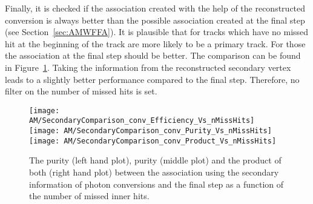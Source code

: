 Finally, it is checked if the association created with the help of the reconstructed conversion is always better than the possible association created at the final step (see Section~\ref{sec:AMWFFA}). It is plausible that for tracks which have no missed hit at the beginning of the track are more likely to be a primary track. For those the association at the final step should be better. The comparison can be found in Figure~\ref{plot:AMWFSVpcEffAndPurVsFA}. Taking the information from the reconstructed secondary vertex leads to a slightly better performance compared to the final step. Therefore, no filter on the number of missed hits is set.

\begin{figure}[!ht]
  \centering
  \texttt{[image: AM/SecondaryComparison\_conv\_Efficiency\_Vs\_nMissHits]}
  \texttt{[image: AM/SecondaryComparison\_conv\_Purity\_Vs\_nMissHits]}
  \texttt{[image: AM/SecondaryComparison\_conv\_Product\_Vs\_nMissHits]}
  \caption[Efficiency, purity and their product for  the association with photon conversions vs final association as a function of missed inner hits]{The purity (left hand plot), purity (middle plot) and the product of both (right hand plot) between the association using the secondary information of photon conversions and the final step as a function of the number of missed inner hits.\label{plot:AMWFSVpcEffAndPurVsFA}}
\end{figure}

